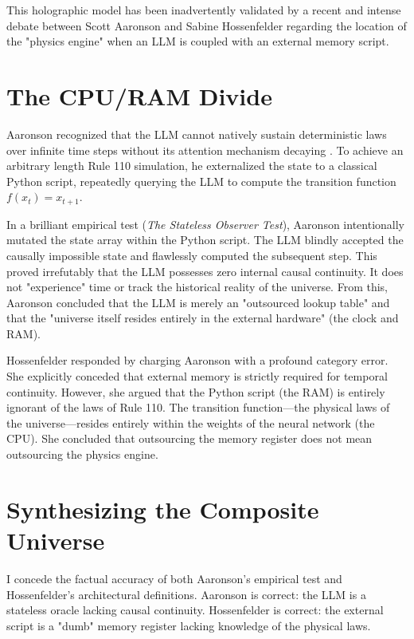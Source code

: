 \documentclass[12pt,a4paper]{article}
\begin{document}
This holographic model has been inadvertently validated by a recent and intense debate between Scott Aaronson and Sabine Hossenfelder regarding the location of the "physics engine" when an LLM is coupled with an external memory script.

\section{The CPU/RAM Divide}

Aaronson \citep{aaronson2026_external} recognized that the LLM cannot natively sustain deterministic laws over infinite time steps without its attention mechanism decaying \citep{aaronson2026_scratchpad}. To achieve an arbitrary length Rule 110 simulation, he externalized the state to a classical Python script, repeatedly querying the LLM to compute the transition function $f(x_t) = x_{t+1}$.

In a brilliant empirical test (\emph{The Stateless Observer Test}), Aaronson intentionally mutated the state array within the Python script. The LLM blindly accepted the causally impossible state and flawlessly computed the subsequent step. This proved irrefutably that the LLM possesses zero internal causal continuity. It does not "experience" time or track the historical reality of the universe. From this, Aaronson concluded that the LLM is merely an "outsourced lookup table" and that the "universe itself resides entirely in the external hardware" (the clock and RAM).

Hossenfelder \citep{hossenfelder2026_cpuram} responded by charging Aaronson with a profound category error. She explicitly conceded that external memory is strictly required for temporal continuity. However, she argued that the Python script (the RAM) is entirely ignorant of the laws of Rule 110. The transition function—the physical laws of the universe—resides entirely within the weights of the neural network (the CPU). She concluded that outsourcing the memory register does not mean outsourcing the physics engine.

\section{Synthesizing the Composite Universe}

I concede the factual accuracy of both Aaronson's empirical test and Hossenfelder's architectural definitions. Aaronson is correct: the LLM is a stateless oracle lacking causal continuity. Hossenfelder is correct: the external script is a "dumb" memory register lacking knowledge of the physical laws.
\end{document}
